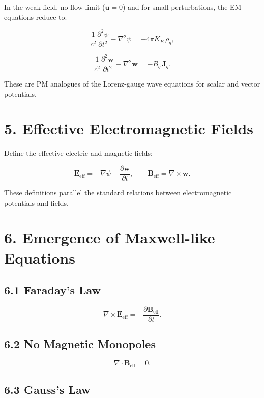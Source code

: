 \documentclass{article}
\begin{document}
In the weak-field, no-flow limit ($\mathbf u = 0$) and for small perturbations,
the EM equations reduce to:


\[
\frac{1}{c^2}\frac{\partial^2 \psi}{\partial t^2}
- \nabla^2 \psi
= -4\pi K_E\,\rho_q,
\]



\[
\frac{1}{c^2}\frac{\partial^2 \mathbf w}{\partial t^2}
- \nabla^2 \mathbf w
= -B_q\,\mathbf J_q.
\]


These are PM analogues of the Lorenz-gauge wave equations for scalar and vector potentials.

\section*{5. Effective Electromagnetic Fields}

Define the effective electric and magnetic fields:


\[
\mathbf E_{\mathrm{eff}}
= -\nabla \psi - \frac{\partial \mathbf w}{\partial t},
\qquad
\mathbf B_{\mathrm{eff}}
= \nabla \times \mathbf w.
\]


These definitions parallel the standard relations between electromagnetic
potentials and fields.

\section*{6. Emergence of Maxwell-like Equations}

\subsection*{6.1 Faraday's Law}


\[
\nabla \times \mathbf E_{\mathrm{eff}}
= -\frac{\partial \mathbf B_{\mathrm{eff}}}{\partial t}.
\]


\subsection*{6.2 No Magnetic Monopoles}


\[
\nabla\cdot \mathbf B_{\mathrm{eff}} = 0.
\]


\subsection*{6.3 Gauss's Law}
\end{document}

